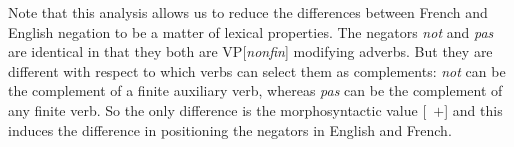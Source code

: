 \documentclass[output=paper
                ,modfonts
                		,nonflat
	        ,collection
	        ,collectionchapter
	        ,collectiontoclongg
 	        ,biblatex
                ,babelshorthands
                ,newtxmath
                ,draftmode
                ,colorlinks, citecolor=brown
]{./langsci/langscibook}
\begin{document}
{\begin{exe}
\begin{xlist}
\begin{exe}
\begin{xlist}
\eal
{}
\zl

\eal
{}
\zl

Note that this analysis allows us to reduce the differences between
French and English negation to be a matter of lexical properties.
The negators \textit{not} and \textit{pas} are identical in that they both are
VP[\textit{nonfin}] modifying adverbs. But they are different with respect to
which verbs can select them as complements:  \textit{not} can be the
complement of a finite auxiliary verb, whereas \textit{pas} can be the
complement of any finite verb.  So the only difference
is the morphosyntactic value [\AUX\ $+$] and this induces
the difference in positioning the negators in English and French.



%




%


\end{xlist}
\end{exe}
\end{xlist}
\end{exe}}
\end{document}
